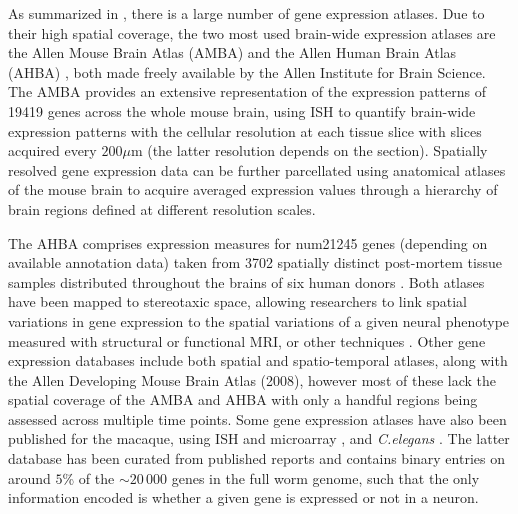 As summarized in \citet{Keil2018}, there is a large number of gene expression atlases.
Due to their high spatial coverage, the two most used brain-wide expression atlases are the Allen Mouse Brain Atlas (AMBA) \citep{Lein2007a} and the Allen Human Brain Atlas (AHBA) \citep{Hawrylycz2012}, both made freely available by the Allen Institute for Brain Science.
The AMBA provides an extensive representation of the expression patterns of \num{19419} genes across the whole mouse brain, using ISH to quantify brain-wide expression patterns with the cellular resolution at each tissue slice with slices acquired every $200\mu$m (the latter resolution depends on the section).
Spatially resolved gene expression data can be further parcellated using anatomical atlases of the mouse brain \citep{Johnson2010,Furth2018} to acquire averaged expression values through a hierarchy of brain regions defined at different resolution scales.

The AHBA comprises expression measures for num{21245} genes (depending on available annotation data) taken from 3702 spatially distinct post-mortem tissue samples distributed throughout the brains of six human donors \citep{Hawrylycz2012,Hawrylycz2015}.
Both atlases have been mapped to stereotaxic space, allowing researchers to link spatial variations in gene expression to the spatial variations of a given neural phenotype measured with structural or functional MRI, or other techniques \citep{Furth2018}.
Other gene expression databases include both spatial \citep{Fertuzinhos2014} and spatio-temporal \citep{Ayoub2011,Belgard2011,Colantuoni2011,Miller2014} atlases, along with the Allen Developing Mouse Brain Atlas (2008), however most of these lack the spatial coverage of the AMBA and AHBA with only a handful regions being assessed across multiple time points. Some gene expression atlases have also been published for the macaque, using ISH and microarray \citep{Bakken2016}, and \textit{C.elegans} \citep{Harris2010}.
The latter database has been curated from published reports and contains binary entries on around $5$\% of the $\sim20\,000$ genes in the full worm genome, such that the only information encoded is whether a given gene is expressed or not in a neuron.

